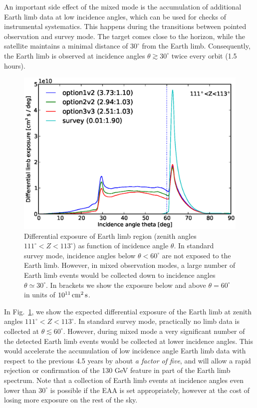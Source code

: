 \documentclass[aps,prd,superscriptaddress,nofootinbib,fixlfloat, 12pt]{revtex4-1}
\begin{document}
An important side effect of the mixed mode is the accumulation of
additional Earth limb data at low incidence angles, which can be used for
checks of instrumental systematics. This happens during the
transitions between pointed observation and survey mode. The target comes
close to the horizon, while the satellite maintains a minimal distance of
$30^\circ$ from the Earth limb. Consequently, the Earth limb is observed at
incidence angles $\theta\gtrsim30^\circ$ twice every orbit (1.5 hours).

\begin{figure}[t]
  \begin{center}
    \includegraphics[width=0.6\linewidth]{plots/limb_exposure.eps}
    \vspace{-0.5cm}
  \end{center}
  \caption{Differential exposure of Earth limb region (zenith angles
    $111^\circ<Z<113^\circ$) as function of incidence angle $\theta$. In
    standard survey mode, incidence angles below $\theta<60^\circ$ are not
    exposed to the Earth limb. However, in mixed observation modes, a
    large number of Earth limb events would be collected down to incidence
    angles $\theta\simeq30^\circ$. In brackets we show the exposure below and
  above $\theta=60^\circ$ in units of $10^{11}\rm\,cm^2\,s$.}
  \label{fig:limb_exposure}
\end{figure}

In Fig.~\ref{fig:limb_exposure}, we show the expected differential exposure of
the Earth limb at zenith angles $111^\circ<Z<113^\circ$. In standard survey
mode, practically no limb data is collected at $\theta\lesssim60^\circ$.
However, during mixed mode a very significant number of the detected Earth
limb events would be collected at lower incidence angles. This would
accelerate the accumulation of low incidence angle Earth limb data with
respect to the previous 4.5 years by about \emph{a factor of five}, and will
allow a rapid rejection or confirmation of the 130 GeV feature in part of the
Earth limb spectrum. Note that a collection of Earth limb events at incidence
angles even lower than $30^\circ$ is possible if the EAA is set appropriately,
however at the cost of losing more exposure on the rest of the sky.
\end{document}
